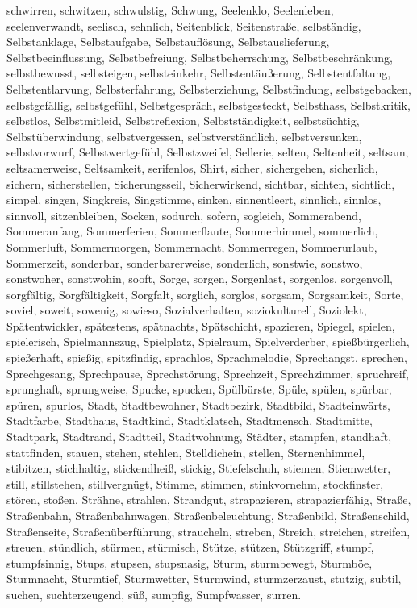 \documentclass[a4paper,10pt,fleqn,twocolumn,twoside,dvipdfmx]{scrartcl}
\begin{document}
schwirren,
schwitzen,
schwulstig,
Schwung,
Seelenklo,
Seelenleben,
seelenverwandt,
seelisch,
sehnlich,
Seitenblick,
Seitenstraße,
selbständig,
Selbstanklage,
Selbstaufgabe,
Selbstauflösung,
Selbstauslieferung,
Selbstbeeinflussung,
Selbstbefreiung,
Selbstbeherrschung,
Selbstbeschränkung,
selbstbewusst,
selbsteigen,
selbsteinkehr,
Selbstentäußerung,
Selbstentfaltung,
Selbstentlarvung,
Selbsterfahrung,
Selbsterziehung,
Selbstfindung,
selbstgebacken,
selbstgefällig,
selbstgefühl,
Selbstgespräch,
selbstgesteckt,
Selbsthass,
Selbstkritik,
selbstlos,
Selbstmitleid,
Selbstreflexion,
Selbstständigkeit,
selbstsüchtig,
Selbstüberwindung,
selbstvergessen,
selbstverständlich,
selbstversunken,
selbstvorwurf,
Selbstwertgefühl,
Selbstzweifel,
Sellerie,
selten,
Seltenheit,
seltsam,
seltsamerweise,
Seltsamkeit,
serifenlos,
Shirt,
sicher,
sichergehen,
sicherlich,
sichern,
sicherstellen,
Sicherungsseil,
Sicherwirkend,
sichtbar,
sichten,
sichtlich,
simpel,
singen,
Singkreis,
Singstimme,
sinken,
sinnentleert,
sinnlich,
sinnlos,
sinnvoll,
sitzenbleiben,
Socken,
sodurch,
sofern,
sogleich,
Sommerabend,
Sommeranfang,
Sommerferien,
Sommerflaute,
Sommerhimmel,
sommerlich,
Sommerluft,
Sommermorgen,
Sommernacht,
Sommerregen,
Sommerurlaub,
Sommerzeit,
sonderbar,
sonderbarerweise,
sonderlich,
sonstwie,
sonstwo,
sonstwoher,
sonstwohin,
sooft,
Sorge,
sorgen,
Sorgenlast,
sorgenlos,
sorgenvoll,
sorgfältig,
Sorgfältigkeit,
Sorgfalt,
sorglich,
sorglos,
sorgsam,
Sorgsamkeit,
Sorte,
soviel,
soweit,
sowenig,
sowieso,
Sozialverhalten,
soziokulturell,
Soziolekt,
Spätentwickler,
spätestens,
spätnachts,
Spätschicht,
spazieren,
Spiegel,
spielen,
spielerisch,
Spielmannszug,
Spielplatz,
Spielraum,
Spielverderber,
spießbürgerlich,
spießerhaft,
spießig,
spitzfindig,
sprachlos,
Sprachmelodie,
Sprechangst,
sprechen,
Sprechgesang,
Sprechpause,
Sprechstörung,
Sprechzeit,
Sprechzimmer,
spruchreif,
sprunghaft,
sprungweise,
Spucke,
spucken,
Spülbürste,
Spüle,
spülen,
spürbar,
spüren,
spurlos,
Stadt,
Stadtbewohner,
Stadtbezirk,
Stadtbild,
Stadteinwärts,
Stadtfarbe,
Stadthaus,
Stadtkind,
Stadtklatsch,
Stadtmensch,
Stadtmitte,
Stadtpark,
Stadtrand,
Stadtteil,
Stadtwohnung,
Städter,
stampfen,
standhaft,
stattfinden,
stauen,
stehen,
stehlen,
Stelldichein,
stellen,
Sternenhimmel,
stibitzen,
stichhaltig,
stickendheiß,
stickig,
Stiefelschuh,
stiemen,
Stiemwetter,
still,
stillstehen,
stillvergnügt,
Stimme,
stimmen,
stinkvornehm,
stockfinster,
stören,
stoßen,
Strähne,
strahlen,
Strandgut,
strapazieren,
strapazierfähig,
Straße,
Straßenbahn,
Straßenbahnwagen,
Straßenbeleuchtung,
Straßenbild,
Straßenschild,
Straßenseite,
Straßenüberführung,
straucheln,
streben,
Streich,
streichen,
streifen,
streuen,
stündlich,
stürmen,
stürmisch,
Stütze,
stützen,
Stützgriff,
stumpf,
stumpfsinnig,
Stups,
stupsen,
stupsnasig,
Sturm,
sturmbewegt,
Sturmböe,
Sturmnacht,
Sturmtief,
Sturmwetter,
Sturmwind,
sturmzerzaust,
stutzig,
subtil,
suchen,
suchterzeugend,
süß,
sumpfig,
Sumpfwasser,
surren.
\end{document}
